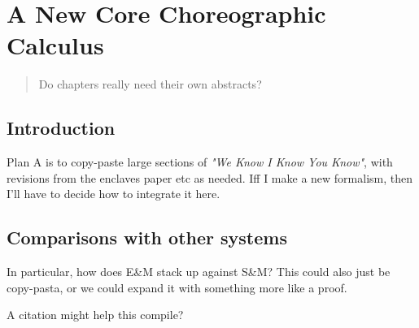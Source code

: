 \chapter{A New Core Choreographic Calculus}
\label{sec:formalism}

\begin{quote}
Do chapters really need their own abstracts?
\end{quote}


\section{Introduction}
Plan A is to copy-paste large sections of \emph{"We Know I Know You Know"}, with revisions from the enclaves paper etc as needed.
Iff I make a new formalism, then I'll have to decide how to integrate it here. 

\section{Comparisons with other systems}
\label{sec:formalism-comparisons}
In particular, how does E\&M stack up against S\&M?
This could also just be copy-pasta, or we could expand it with something more like a proof.

A citation might help this compile? 



